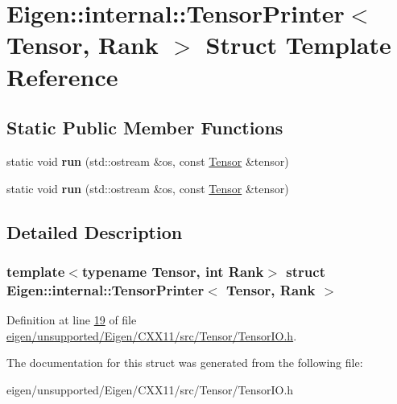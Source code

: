 \hypertarget{struct_eigen_1_1internal_1_1_tensor_printer}{}\section{Eigen\+:\+:internal\+:\+:Tensor\+Printer$<$ Tensor, Rank $>$ Struct Template Reference}
\label{struct_eigen_1_1internal_1_1_tensor_printer}
\subsection*{Static Public Member Functions}
\begin{DoxyCompactItemize}
\item 
\mbox{\label{struct_eigen_1_1internal_1_1_tensor_printer_a8021cfd7526ef9baf49379ff95465ab2}} 
static void {\bfseries run} (std\+::ostream \&os, const \hyperlink{class_eigen_1_1_tensor}{Tensor} \&tensor)
\item 
\mbox{\label{struct_eigen_1_1internal_1_1_tensor_printer_a8021cfd7526ef9baf49379ff95465ab2}} 
static void {\bfseries run} (std\+::ostream \&os, const \hyperlink{class_eigen_1_1_tensor}{Tensor} \&tensor)
\end{DoxyCompactItemize}


\subsection{Detailed Description}
\subsubsection*{template$<$typename Tensor, int Rank$>$\newline
struct Eigen\+::internal\+::\+Tensor\+Printer$<$ Tensor, Rank $>$}



Definition at line \hyperlink{eigen_2unsupported_2_eigen_2_c_x_x11_2src_2_tensor_2_tensor_i_o_8h_source_l00019}{19} of file \hyperlink{eigen_2unsupported_2_eigen_2_c_x_x11_2src_2_tensor_2_tensor_i_o_8h_source}{eigen/unsupported/\+Eigen/\+C\+X\+X11/src/\+Tensor/\+Tensor\+I\+O.\+h}.



The documentation for this struct was generated from the following file\+:\begin{DoxyCompactItemize}
\item 
eigen/unsupported/\+Eigen/\+C\+X\+X11/src/\+Tensor/\+Tensor\+I\+O.\+h\end{DoxyCompactItemize}
